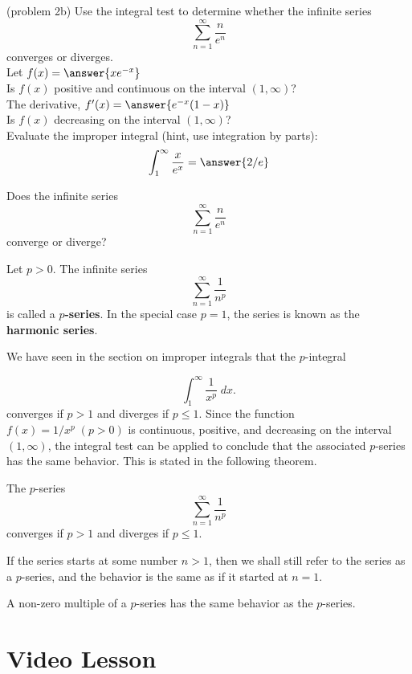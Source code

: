 \documentclass[handout]{ximera}
\begin{document}
\begin{problem}(problem 2b)
Use the integral test to determine whether the infinite series
\[
\sum_{n=1}^\infty \frac{n}{e^n}
\]
converges or diverges.\\

Let $f(x) = \answer{xe^{-x}}$\\

Is $f(x)$ positive and continuous on the interval $(1, \infty)$?\\ %

The derivative, $f'(x) = \answer{e^{-x}(1-x)}$\\

Is $f(x)$ decreasing on the interval $(1, \infty)$? \\


Evaluate the improper integral (hint, use integration by parts): 
\[
 \int_1^\infty \frac{x}{e^x} = \answer{2/e}
\]

Does the infinite series
\[
\sum_{n=1}^\infty \frac{n}{e^n}
\]
converge or diverge? 


\end{problem}


\begin{definition}[p-series]
Let $p > 0$. The infinite series
\[
\sum_{n=1}^\infty \frac{1}{n^p}
\]
is called a \textbf{$p$-series}. In the special case $p = 1$, the series is known as the \textbf{harmonic series}.
\end{definition}

We have seen in the section on improper integrals that the $p$-integral

\[
\int_1^\infty \frac{1}{x^p} \; dx.
\]
converges if $p > 1$ and diverges if $p \leq 1$.
Since the function $f(x) = 1/x^p \; (p > 0)$ is continuous, positive, and decreasing on the interval $(1, \infty)$,
the integral test can be applied to conclude that the associated $p$-series has the same behavior.  This is stated in the following theorem.


\begin{theorem}[$p$-series]
The $p$-series
\[
\sum_{n=1}^\infty \frac{1}{n^p}
\]
converges if $p > 1$ and diverges if $p \leq 1$.
\end{theorem}

\begin{remark}
If the series starts at some number $n >1$, then we shall still refer to the 
series as a $p$-series, and the behavior is the same as if it started at $n=1$.
\end{remark}

\begin{remark}
A non-zero multiple of a $p$-series has the same behavior as the $p$-series.
\end{remark}

\section{Video Lesson}

\begin{center}
\begin{foldable}
\end{foldable}
\end{center}
\end{document}

